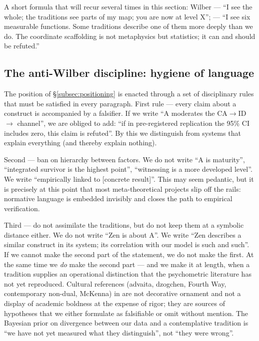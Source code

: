 A short formula that will recur several times in this section: Wilber --- ``I see the whole; the traditions see parts of my map; you are now at level X''; \DEIC{} --- ``I see six measurable functions. Some traditions describe one of them more deeply than we do. The coordinate scaffolding is not metaphysics but statistics; it can and should be refuted.''

\subsection{The anti-Wilber discipline: hygiene of language}
\label{subsec:discipline}

The position of §\ref{subsec:positioning} is enacted through a set of disciplinary rules that must be satisfied in every paragraph. First rule --- every claim about a construct is accompanied by a falsifier. If we write ``A moderates the CA$\to$ID$\to$\EAF{} channel'', we are obliged to add: ``if in pre-registered replication the \IMM{} 95\% CI includes zero, this claim is refuted''. By this we distinguish \DEIC{} from systems that explain everything (and thereby explain nothing).

Second --- ban on hierarchy between factors. We do not write ``A is maturity'', ``integrated survivor is the highest point'', ``witnessing is a more developed level''. We write ``empirically linked to [concrete result]''. This may seem pedantic, but it is precisely at this point that most meta-theoretical projects slip off the rails: normative language is embedded invisibly and closes the path to empirical verification.

Third --- do not assimilate the traditions, but do not keep them at a symbolic distance either. We do not write ``Zen is about A''. We write ``Zen describes a similar construct in its system; its correlation with our model is such and such''. If we cannot make the second part of the statement, we do not make the first. At the same time we \emph{do} make the second part --- and we make it at length, when a tradition supplies an operational distinction that the psychometric literature has not yet reproduced. Cultural references (advaita, dzogchen, Fourth Way, contemporary non-dual, McKenna) in \DEIC{} are not decorative ornament and not a display of academic boldness at the expense of rigor; they are sources of hypotheses that we either formulate as falsifiable or omit without mention. The Bayesian prior on divergence between our data and a contemplative tradition is ``we have not yet measured what they distinguish'', not ``they were wrong''.

